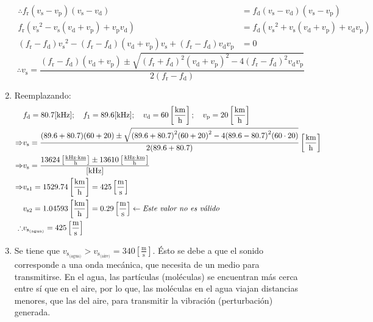 \begin{enumerate}
\begin{align*}
\therefore f_{\text{r}}(v_{\text{s}}-v_{\text{p}})(v_{\text{s}}-v_{\text{d}})&= f_{\text{d}}(v_{\text{s}}-v_{\text{d}})(v_{\text{s}}-v_{\text{p}})\\
f_{\text{r}}({v_{\text{s}}}^2-v_{\text{s}}(v_{\text{d}}+v_{\text{p}})+v_{\text{p}}v_{\text{d}})&=f_{\text{d}}({v_{\text{s}}}^2+v_{\text{s}}(v_{\text{d}}+v_{\text{p}})+v_{\text{d}}v_{\text{p}})\\
(f_{\text{r}}-f_{\text{d}}){v_{\text{s}}}^2-(f_{\text{r}}-f_{\text{d}})(v_{\text{d}}+v_{\text{p}})v_{\text{s}}+(f_{\text{r}}-f_{\text{d}})v_{\text{d}}v_{\text{p}}&=0
\end{align*}
\begin{equation*}
\therefore v_{\text{s}}=\frac{(f_{\text{r}}-f_{\text{d}})(v_{\text{d}}+v_{\text{p}})\pm\sqrt{{(f_{\text{r}}+f_{\text{d}})}^2{(v_{\text{d}}+v_{\text{p}})}^2-4{(f_{\text{r}}-f_{\text{d}})}^2v_{\text{d}}v_{\text{p}}}}{2(f_{\text{r}}-f_{\text{d}})}
\end{equation*}

\item
Reemplazando:
\begin{align*}
&f_{\text{d}}=80.7 [\text{kHz}];\quad f_1=89.6 [\text{kHz}];\quad v_{\text{d}}=60  \left[\frac{\text{km}}{\text{h}}\right] ;\quad v_{\text{p}}=20 \left[\frac{\text{km}}{\text{h}}\right]\\
\Rightarrow &v_{\text{s}}=\frac{(89.6+80.7)(60+20)\pm\sqrt{{(89.6+80.7)}^2{(60+20)}^2-4{(89.6-80.7)}^2(60 \cdot 20)}}{2(89.6+80.7)}\left[\frac{\text{km}}{\text{h}}\right]\\
\Rightarrow &v_{\text{s}}=\frac{13624\left[\frac{\text{kHz}\cdot\text{km}}{\text{h}}\right] \pm 13610 \left[\frac{\text{kHz}\cdot\text{km}}{\text{h}}\right]}{\text{[kHz]}}\\
\Rightarrow &v_{\text{s}1} = 1529.74 \left[\frac{\text{km}}{\text{h}}\right] = 425 \left[\frac{\text{m}}{\text{s}}\right]\\
&v_{\text{s}2}= 1.04593 \left[\frac{\text{km}}{\text{h}}\right] = 0.29 \left[\frac{\text{m}}{\text{s}}\right] \leftarrow \text{\textit{Este valor no es válido}}\\
\therefore &v_{\text{s}_{\text{(agua)}}}=425 \left[\frac{\text{m}}{\text{s}}\right]
\end{align*}

\item
Se tiene que \(v_{\text{s}_{\text{(agua)}}}>v_{\text{s}_{\text{(aire)}}}=340 \left[\frac{\text{m}}{\text{s}}\right]\). Ésto se debe a que el sonido corresponde a una onda mecánica, que necesita de un medio para transmitirse. En el agua, las partículas (moléculas) se encuentran más cerca entre sí que en el aire, por lo que, las moléculas en el agua viajan distancias menores, que las del aire, para transmitir la vibración (perturbación) generada.
\end{enumerate}
